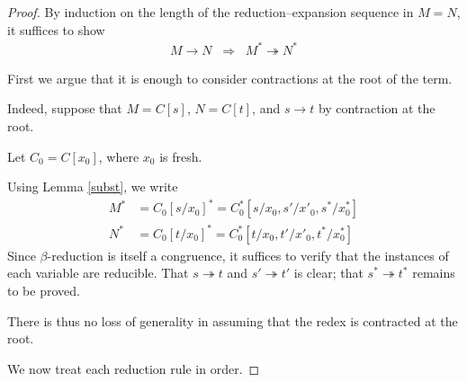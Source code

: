 \documentclass[10pt]{article}
\newcommand{\then}{\;\Longrightarrow\;}
\newcommand{\thra}{\twoheadrightarrow}
\begin{document}
\begin{proof}
By induction on the length of the reduction--expansion sequence in
  $M=N$, it suffices to show
  \begin{align} \label{conv}
    M \to N \;\then\; M^* \thra N^*
  \end{align}

First we argue that it is enough to consider contractions at the root
of the term.

Indeed, suppose that $M = C[s]$, $N = C[t]$, and $s \to t$ by
contraction
at the root.

Let $C_0 = C[x_0]$, where $x_0$ is fresh.

Using Lemma \ref{subst}, we write
\begin{align*}
  M^* &= C_0[s/x_0]^* =C_0^*[s/x_0,s'/x'_0,s^*/x^*_0]\\
  N^* &= C_0[t/x_0]^* = C_0^*[t/x_0,t'/x'_0,t^*/x^*_0]
\end{align*}
Since $\beta$-reduction is itself a congruence, it suffices to verify
that the instances of each variable are reducible.  That $s \thra t$ and $s' \thra
t'$
is clear; that $s^* \thra t^*$ remains to be proved.

There is thus no loss of generality in assuming that the
redex is contracted at the root.

We now treat each reduction rule in order.


\end{proof}
\end{document}
